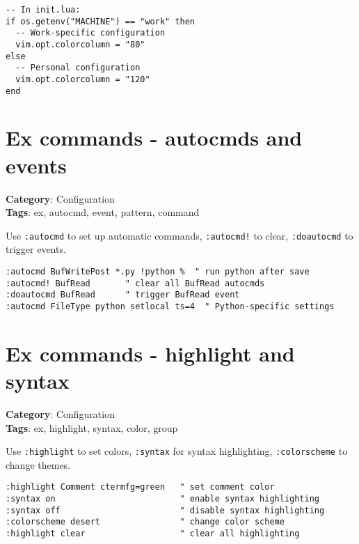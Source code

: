 {{{\begin{Exa*}{}
\begin{Verbatim}[fontsize=\footnotesize, breaklines, breakanywhere]
-- In init.lua:
if os.getenv("MACHINE") == "work" then
  -- Work-specific configuration
  vim.opt.colorcolumn = "80"
else  
  -- Personal configuration
  vim.opt.colorcolumn = "120"
end
\end{Verbatim}
\end{Exa*}

\section{Ex commands - autocmds and events}

\textbf{Category}: Configuration\\ \textbf{Tags}: ex, autocmd, event, pattern, command
\vspace{0.5cm}

Use {\footnotesize \Verb§:autocmd§} to set up automatic commands, {\footnotesize \Verb§:autocmd!§} to clear, {\footnotesize \Verb§:doautocmd§} to trigger events.

\begin{Exa*}{}
\begin{Verbatim}[fontsize=\footnotesize, breaklines, breakanywhere]
:autocmd BufWritePost *.py !python %  " run python after save
:autocmd! BufRead       " clear all BufRead autocmds
:doautocmd BufRead      " trigger BufRead event
:autocmd FileType python setlocal ts=4  " Python-specific settings
\end{Verbatim}
\end{Exa*}

\section{Ex commands - highlight and syntax}

\textbf{Category}: Configuration\\ \textbf{Tags}: ex, highlight, syntax, color, group
\vspace{0.5cm}

Use {\footnotesize \Verb§:highlight§} to set colors, {\footnotesize \Verb§:syntax§} for syntax highlighting, {\footnotesize \Verb§:colorscheme§} to change themes.

\begin{Exa*}{}
\begin{Verbatim}[fontsize=\footnotesize, breaklines, breakanywhere]
:highlight Comment ctermfg=green   " set comment color
:syntax on                         " enable syntax highlighting
:syntax off                        " disable syntax highlighting
:colorscheme desert                " change color scheme
:highlight clear                   " clear all highlighting
\end{Verbatim}
\end{Exa*}

}}}
